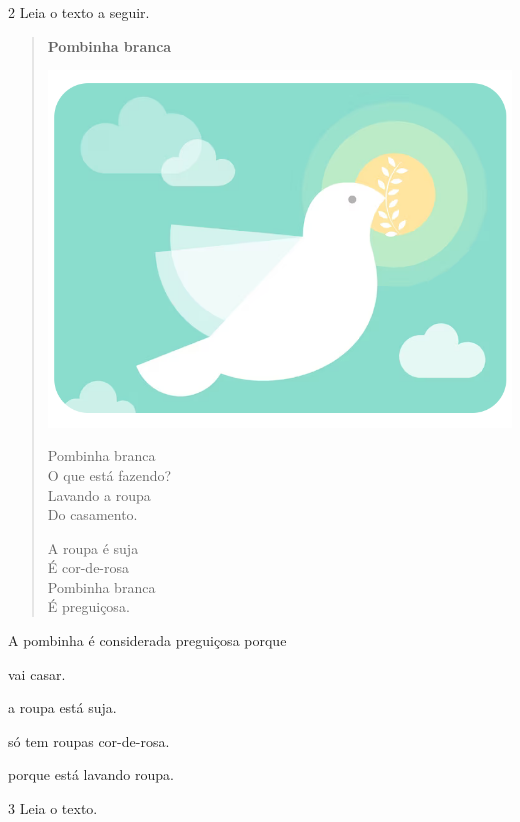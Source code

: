 \num{2} Leia o texto a seguir.

\begin{myquote}
\begin{verse}
\textbf{Pombinha branca}

\begin{center}
\noindent\includegraphics[width=.4\textwidth]{media/image186.png}
\end{center}

Pombinha branca \\
O que está fazendo?\\
Lavando a roupa\\
Do casamento.

A roupa é suja\\
É cor-de-rosa\\
Pombinha branca\\
É preguiçosa.

\end{verse}

\end{myquote}

A pombinha é considerada preguiçosa porque

\begin{escolha}
	\item vai casar.

	\item a roupa está suja.

	\item só tem roupas cor-de-rosa.

	\item porque está lavando roupa.
\end{escolha}

\pagebreak
\num{3} Leia o texto.

